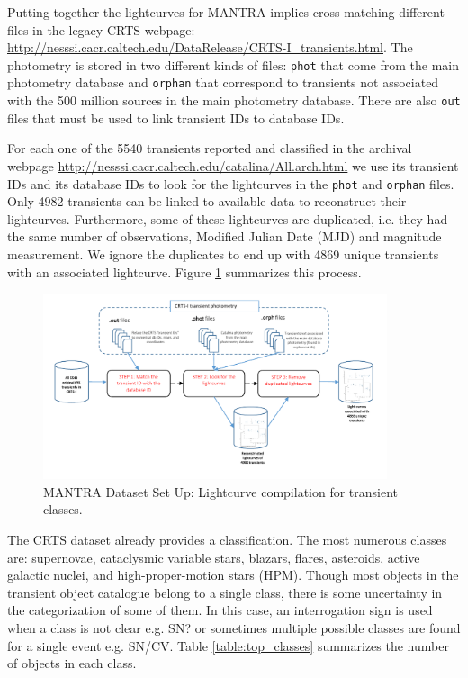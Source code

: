 \documentclass{aastex62}
\begin{document}
Putting together the lightcurves for MANTRA implies
cross-matching different files in the legacy CRTS webpage:
\url{http://nesssi.cacr.caltech.edu/DataRelease/CRTS-I_transients.html}. 
The photometry is stored in two different kinds of files: \verb"phot"
that come from the main photometry database and \verb"orphan" that
correspond to transients not associated with the 500 million sources
in the main photometry database.
There are also \verb"out" files that must be used to link transient
IDs to database IDs.


For each one of the 5540 transients reported and classified in the
archival webpage \url{http://nesssi.cacr.caltech.edu/catalina/All.arch.html} we use its
transient IDs and its database IDs to look for the lightcurves in the
\texttt{phot} and \texttt{orphan} files. 
Only 4982 transients can be linked to available data to reconstruct
their lightcurves. 
Furthermore, some of these lightcurves are duplicated, i.e. they had
the same number of observations, Modified Julian Date (MJD) and magnitude measurement. 
We ignore the duplicates to end up with 4869 unique transients with an 
associated lightcurve. Figure \ref{fig:transients} summarizes this process. 

\begin{figure}
	\includegraphics[width=0.9\textwidth]{Transients.pdf}
  \caption{MANTRA Dataset Set Up: Lightcurve compilation for transient classes.}
  \label{fig:transients}
\end{figure} 

The CRTS dataset already provides a classification. 
The most numerous classes are: supernovae,
cataclysmic variable stars, blazars, flares, asteroids, active
galactic nuclei, and high-proper-motion stars (HPM). 
Though most objects in the transient object catalogue belong to a single class, 
there is some uncertainty in the categorization of some of them.  
In this case, an interrogation sign is used when a class is not clear 
e.g. SN? or sometimes multiple possible classes are found for a single 
event e.g. SN/CV. 
Table \ref{table:top_classes} summarizes the number of objects in each class. 
\end{document}

